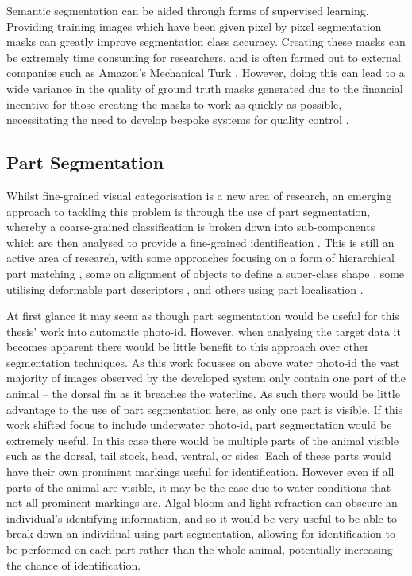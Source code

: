Semantic segmentation can be aided through forms of supervised learning. Providing training images which have been given pixel by pixel segmentation masks can greatly improve segmentation class accuracy. Creating these masks can be extremely time consuming for researchers, and is often farmed out to external companies such as Amazon's Mechanical Turk \cite{buhrmester_amazons_2011}. However, doing this can lead to a wide variance in the quality of ground truth masks generated due to the financial incentive for those creating the masks to work as quickly as possible, necessitating the need to develop bespoke systems for quality control \cite{maji_large_2011}.

\subsection{Part Segmentation}\label{ch:Background,sec:Fine-grainedCV,sub:PartSegmentation}

Whilst fine-grained visual categorisation is a new area of research, an emerging approach to tackling this problem is through the use of part segmentation, whereby a coarse-grained classification is broken down into sub-components which are then analysed to provide a fine-grained identification \cite{zhang_part-based_2014}. This is still an active area of research, with some approaches focusing on a form of hierarchical part matching \cite{xie_hierarchical_2013}, some on alignment of objects to define a super-class shape \cite{gavves_fine-grained_2013}, some utilising deformable part descriptors \cite{zhang_deformable_2013}, and others using part localisation \cite{liu_dog_2012}.

At first glance it may seem as though part segmentation would be useful for this thesis' work into automatic photo-id. However, when analysing the target data it becomes apparent there would be little benefit to this approach over other segmentation techniques. As this work focusses on above water photo-id the vast majority of images observed by the developed system only contain one part of the animal -- the dorsal fin as it breaches the waterline.  As such there would be little advantage to the use of part segmentation here, as only one part is visible. If this work shifted focus to include underwater photo-id, part segmentation would be extremely useful. In this case there would be multiple parts of the animal visible such as the dorsal, tail stock, head, ventral, or sides. Each of these parts would have their own prominent markings useful for identification. However even if all parts of the animal are visible, it may be the case due to water conditions that not all prominent markings are. Algal bloom and light refraction can obscure an individual's identifying information, and so it would be very useful to be able to break down an individual using part segmentation, allowing for identification to be performed on each part rather than the whole animal, potentially increasing the chance of identification.  

